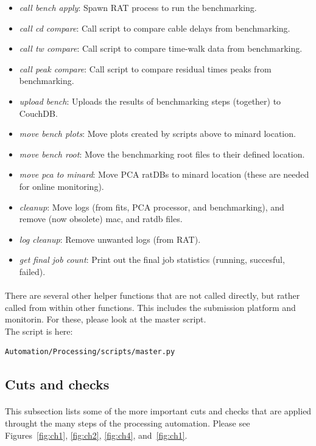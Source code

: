 \documentclass[12pt]{article}
\begin{document}
\begin{itemize}
	\item \textit{call bench apply}: Spawn RAT process to run the benchmarking.
	\item \textit{call cd compare}: Call script to compare cable delays from benchmarking.
	\item \textit{call tw compare}: Call script to compare time-walk data from benchmarking.
	\item \textit{call peak compare}: Call script to compare residual times peaks from benchmarking.
	\item \textit{upload bench}: Uploads the results of benchmarking steps (together) to CouchDB.
	\item \textit{move bench plots}: Move plots created by scripts above to minard location.
	\item \textit{move bench root}: Move the benchmarking root files to their defined location.
	\item \textit{move pca to minard}: Move PCA ratDBs to minard location (these are needed for online monitoring).
	\item \textit{cleanup}: Move logs (from fits, PCA processor, and benchmarking), and remove (now obsolete) mac, and ratdb files.
	\item \textit{log cleanup}: Remove unwanted logs (from RAT).
	\item \textit{get final job count}: Print out the final job statistics (running, succesful, failed).
\end{itemize}

\paragraph{}
There are several other helper functions that are not called directly, but rather called from within other functions. This includes the submission platform and monitorin. For these, please look at the master script.\\
The script is here:
\begin{lstlisting}
Automation/Processing/scripts/master.py
\end{lstlisting}

\clearpage

\subsection{Cuts and checks}
\paragraph{}
This subsection lists some of the more important cuts and checks that are applied throught the many steps of the processing automation. Please see Figures~\ref{fig:ch1}, \ref{fig:ch2}, \ref{fig:ch4}, and~\ref{fig:ch1}.
\end{document}
